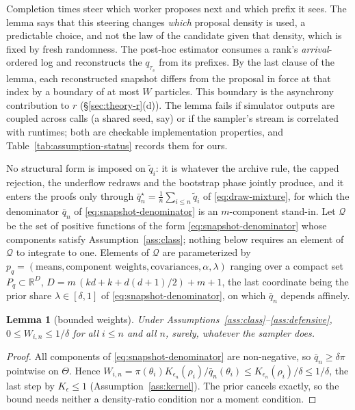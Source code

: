 \documentclass[10pt]{article}
\theoremstyle{plain}
\newtheorem{lemma}[theorem]{Lemma}
\theoremstyle{definition}
\begin{document}
Completion times steer which worker proposes next and which prefix it sees. The lemma says that this steering changes \emph{which} proposal density is used, a predictable choice, and not the law of the candidate given that density, which is fixed by fresh randomness. The post-hoc estimator consumes a rank's \emph{arrival}-ordered log and reconstructs the $q_{\tau_s}$ from its prefixes. By the last clause of the lemma, each reconstructed snapshot differs from the proposal in force at that index by a boundary of at most $W$ particles. This boundary is the asynchrony contribution to $r$ (\S\ref{sec:theory-r}(d)). The lemma fails if simulator outputs are coupled across calls (a shared seed, say) or if the sampler's stream is correlated with runtimes; both are checkable implementation properties, and Table~\ref{tab:assumption-status} records them for ours.

No structural form is imposed on $\tilde q_i$: it is whatever the archive rule, the capped rejection, the underflow redraws and the bootstrap phase jointly produce, and it enters the proofs only through $\bar q^\star_n=\tfrac1n\sum_{i\le n}\tilde q_i$ of \eqref{eq:draw-mixture}, for which the denominator $\bar q_n$ of \eqref{eq:snapshot-denominator} is an $m$-component stand-in. Let $\mathcal{Q}$ be the set of positive functions of the form \eqref{eq:snapshot-denominator} whose components satisfy Assumption~\ref{ass:class}; nothing below requires an element of $\mathcal{Q}$ to integrate to one. Elements of $\mathcal{Q}$ are parameterized by $p_q=(\text{means},\text{component weights},\text{covariances},\alpha,\lambda)$ ranging over a compact set $P_q\subset\mathbb{R}^{D}$, $D=m\,(kd+k+d(d+1)/2)+m+1$, the last coordinate being the prior share $\lambda\in[\delta,1]$ of \eqref{eq:snapshot-denominator}, on which $\bar q_n$ depends affinely.

\begin{lemma}[bounded weights]\label{lem:bounded}
Under Assumptions~\ref{ass:class}--\ref{ass:defensive}, $0\le W_{i,n}\le1/\delta$ for all $i\le n$ and all $n$, surely, whatever the sampler does.
\end{lemma}
\begin{proof}
All components of \eqref{eq:snapshot-denominator} are non-negative, so $\bar q_n\ge\delta\pi$ pointwise on $\Theta$. Hence $W_{i,n}=\pi(\theta_i)K_{\epsilon_n}(\rho_i)/\bar q_n(\theta_i)\le K_{\epsilon_n}(\rho_i)/\delta\le1/\delta$, the last step by $K_\epsilon\le1$ (Assumption~\ref{ass:kernel}). The prior cancels exactly, so the bound needs neither a density-ratio condition nor a moment condition.
\end{proof}
\end{document}
